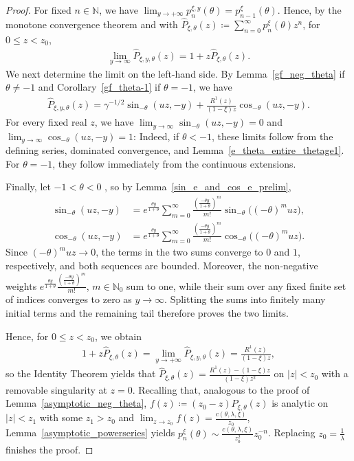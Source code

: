 \documentclass[12pt]{article}
\newcommand{\N}{\mathbb{N}} %
\newcommand{\1}{\mathds{1}}
\theoremstyle{definition}
\theoremstyle{plain}
\theoremstyle{remark}
\begin{document}
\begin{proof}
For fixed $n\in\N$, we have $\lim_{y\to+\infty} p_n^{\xi,y}(\theta)= p_{n-1}^{\xi}(\theta)$. Hence, by the monotone convergence theorem and with $\hat P_{\xi,\theta}(z)\coloneqq \sum_{n=0}^\infty p_n^\xi(\theta) z^n$, for $0\leq z<z_0$,
\begin{align*}
    \lim_{y\to\infty}\hat P_{\xi,y,\theta}(z)=1+z\hat P_{\xi,\theta}(z).
\end{align*}
We next determine the limit on the left-hand side. By Lemma~\ref{gf_neg_theta} if $\theta\neq -1$ and Corollary~\ref{gf_theta-1} if $\theta=-1$, we have
\begin{align*}
    \hat P_{\xi,y,\theta}(z)=\gamma^{-1/2}\sin_{-\theta}(uz,-y)+\frac{R^1(z)}{(1-\xi)z}\cos_{-\theta}(uz,-y).
\end{align*}
For every fixed real $z$, we have $\lim_{y\to\infty}\sin_{-\theta}(uz,-y)=0$ and $\lim_{y\to\infty}\cos_{-\theta}(uz,-y)=1$:
Indeed, if $\theta<-1$, these limits follow from the defining series,
dominated convergence, and Lemma~\ref{e_theta_entire_thetage1}.
For $\theta=-1$, they follow immediately from the continuous
extensions.

Finally, let $-1<\theta<0$ , so by Lemma~\ref{sin_e_and_cos_e_prelim},
\begin{align*}
    \sin_{-\theta}(uz,-y)
    &=e^{\frac{\theta y}{1+\theta}}\sum_{m=0}^\infty\frac{\left(\frac{-\theta y}{1+\theta}\right)^m}{m!}\sin_{-\theta}\bigl((-\theta)^m uz\bigr),\\
    \cos_{-\theta}(uz,-y)
    &= e^{\frac{\theta y}{1+\theta}}\sum_{m=0}^\infty\frac{\left(\frac{-\theta y}{1+\theta}\right)^m}{m!}\cos_{-\theta}\bigl((-\theta)^m uz\bigr).
\end{align*}
Since $(-\theta)^m uz\to0$, the terms in the two sums converge to
$0$ and $1$, respectively, and both sequences are bounded. Moreover,
the non-negative weights $e^{\frac{\theta y}{1+\theta}}\frac{\left(\frac{-\theta y}{1+\theta}\right)^m}{m!}$, $m\in\N_0$ sum to one, while their sum over any fixed finite set of indices
converges to zero as $y\to\infty$. Splitting the sums into finitely
many initial terms and the remaining tail therefore proves the two
limits.

Hence, for $0\le z<z_0$, we obtain
\begin{align*}
    1+z\hat P_{\xi,\theta}(z)=\lim_{y\to+\infty}\hat P_{\xi,y,\theta}(z)=\frac{R^1(z)}{(1-\xi)z},
\end{align*}
so the Identity Theorem yields that $\hat P_{\xi,\theta}(z)=\frac{R^1(z)-(1-\xi)z}{(1-\xi)z^2}$ on $|z|<z_0$ with a removable singularity at $z=0$. Recalling that, analogous to the proof of Lemma~\ref{asymptotic_neg_theta}, $f(z)\coloneqq (z_0-z)\hat P_{\xi,\theta}(z)$ is analytic on $|z|<z_1$ with some $z_1>z_0$ and
$\lim_{z\to z_0}f(z)=\frac{c(\theta,\lambda,\xi)}{z_0}$, Lemma~\ref{asymptotic_powerseries} yields $ p_n^{\xi}(\theta)\sim \frac{c(\theta,\lambda,\xi)}{z_0^2}z_0^{-n}$.
   Replacing $z_0=\frac{1}{\lambda}$ finishes the proof.
\end{proof}
\end{document}
